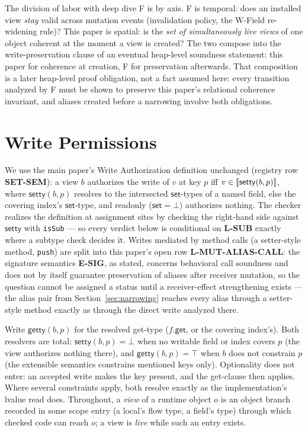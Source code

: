 \documentclass[11pt]{article}
\newcommand{\setty}{\mathsf{setty}}
\newcommand{\getty}{\mathsf{getty}}
\begin{document}
The division of labor with deep dive F is by axis. F is temporal: does
an installed view \emph{stay} valid across mutation events (invalidation
policy, the W-Field re-widening rule)? This paper is spatial: is the
\emph{set of simultaneously live views} of one object coherent at the
moment a view is created? The two compose into the write-preservation
clause of an eventual heap-level soundness statement: this paper for
coherence at creation, F for preservation afterwards. That composition
is a later heap-level proof obligation, not a fact assumed here: every
transition analyzed by F must be shown to preserve this paper's relational
coherence invariant, and aliases created before a narrowing involve
both obligations.


\section{Write Permissions}
\label{sec:recap}

We use the main paper's Write Authorization definition unchanged
(registry row \textbf{SET-SEM}): a view $b$ authorizes the write of $v$
at key $p$ iff $v \in \sem{\setty(b,p)}$, where $\setty(b,p)$ resolves
to the intersected $\mathsf{set}$-types of a named field, else the
covering index's $\mathsf{set}$-type, and readonly
($\mathsf{set}=\bot$) authorizes nothing. The checker realizes the
definition at assignment sites by checking the right-hand side against
$\setty$ with \texttt{isSub} — so every verdict below is conditional on
\textbf{L-SUB} exactly where a subtype check decides it. Writes mediated
by method calls (a setter-style method, \texttt{push}) are split into
this paper's open row
\textbf{L-MUT-ALIAS-CALL}: the signature semantics \textbf{E-SIG}, as
stated, concerns behavioral call soundness and does not by itself
guarantee preservation of aliases after receiver mutation, so the question
cannot be assigned a status until a receiver-effect strengthening exists — the
alias pair from Section~\ref{sec:narrowing} reaches every
alias through a setter-style method exactly as through the direct
write analyzed there.

Write $\getty(b,p)$ for the resolved get-type ($f.\mathsf{get}$, or the
covering index's). Both resolvers are total: $\setty(b,p) = \bot$ when
no writable field or index covers $p$ (the view authorizes nothing
there), and $\getty(b,p) = \top$ when $b$ does not constrain $p$ (the
extensible semantics constrains mentioned keys only). Optionality does
not enter: an accepted write makes the key present, and the get-clause
then applies. Where several constraints apply, both resolve exactly as
the implementation's lvalue read does. Throughout, a \emph{view} of a
runtime object $o$ is
an object branch recorded in some scope entry (a local's flow type, a
field's type) through which checked code can reach $o$; a view is
\emph{live} while such an entry exists.
\end{document}

